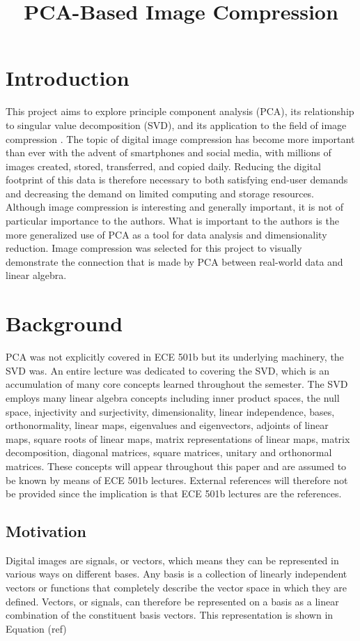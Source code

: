 \documentclass[conference]{IEEEtran}
\title{PCA-Based Image Compression}
\author{
\IEEEauthorblockN{Owen Sowatzke}
\IEEEauthorblockA{\textit{Electrical Engineering Department} \\
\textit{University of Arizona}\\
Tucson, USA \\
osowatzke@arizona.edu}
\and
\IEEEauthorblockN{Scott Thoesen}
\IEEEauthorblockA{\textit{Electrical Engineering Department} \\
\textit{University of Arizona}\\
Tucson, USA \\
thoesens@arizona.edu}}
\begin{document}
    \maketitle
		
    \section{Introduction}
    This project aims to explore principle component analysis (PCA), its relationship to singular value decomposition (SVD), and its application to the field of image compression \cite{jaradet_svd_image_compression}. The topic of digital image compression has become more important than ever with the advent of smartphones and social media, with millions of images created, stored, transferred, and copied daily. Reducing the digital footprint of this data is therefore necessary to both satisfying end-user demands and decreasing the demand on limited computing and storage resources. Although image compression is interesting and generally important, it is not of particular importance to the authors. What is important to the authors is the more generalized use of PCA as a tool for data analysis and dimensionality reduction. Image compression was selected for this project to visually demonstrate the connection that is made by PCA between real-world data and linear algebra.

    \section{Background}
    PCA was not explicitly covered in ECE 501b but its underlying machinery, the SVD was. An entire lecture was dedicated to covering the SVD, which is an accumulation of many core concepts learned throughout the semester. The SVD employs many linear algebra concepts including inner product spaces, the null space, injectivity and surjectivity, dimensionality, linear independence, bases, orthonormality, linear maps, eigenvalues and eigenvectors, adjoints of linear maps, square roots of linear maps, matrix representations of linear maps, matrix decomposition, diagonal matrices, square matrices, unitary and orthonormal matrices. These concepts will appear throughout this paper and are assumed to be known by means of ECE 501b lectures. External references will therefore not be provided since the implication is that ECE 501b lectures are the references.

    \subsection{Motivation}
    Digital images are signals, or vectors, which means they can be represented in various ways on different bases. Any basis is a collection of linearly independent vectors or functions that completely describe the vector space in which they are defined. Vectors, or signals, can therefore be represented on a basis as a linear combination of the constituent basis vectors. This representation is shown in Equation (ref)
\end{document}
